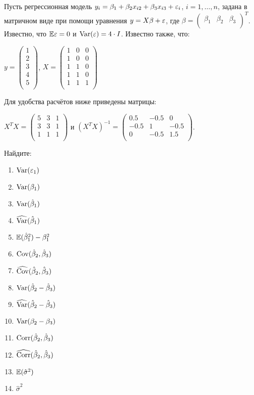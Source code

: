 \documentclass[pdftex,11pt,openany]{book}\usepackage[]{graphicx}\usepackage[]{color}
\begin{document}
\begin{problem}
Пусть регрессионная модель $y_i = \beta_1 + \beta_2 x_{i2} + \beta_3 x_{i3} + \varepsilon_i$, $i = 1, \ldots, n$, задана в матричном виде при помощи уравнения $y = X \beta + \varepsilon$, где $\beta =  \begin{pmatrix}
\beta_1 & \beta_2 & \beta_3\\
\end{pmatrix} ^T$. Известно, что $\mathbb{E} \varepsilon = 0$ и $\operatorname{Var} (\varepsilon) = 4 \cdot I$. Известно также, что:

$y =  \begin{pmatrix}
1 \\
2 \\
3 \\
4 \\
5 \\
\end{pmatrix} $, $X =  \begin{pmatrix}
1 & 0 & 0 \\
1 & 0 & 0 \\
1 & 1 & 0 \\
1 & 1 & 0 \\
1 & 1 & 1 \\
\end{pmatrix} $

Для удобства расчётов ниже приведены матрицы:

$X^T X =  \begin{pmatrix}
5 & 3 & 1 \\
3 & 3 & 1 \\
1 & 1 & 1 \\
\end{pmatrix} $ и $(X^T X)^{-1} =  \begin{pmatrix}
0.5 & -0.5 & 0 \\
-0.5 & 1 & -0.5 \\
0 & -0.5 & 1.5 \\
\end{pmatrix} $.

Найдите:
\begin{enumerate}
\item $\operatorname{Var} (\varepsilon_1)$
\item $\operatorname{Var} (\beta_1)$
\item $\operatorname{Var} (\hat{\beta}_1)$
\item $\widehat{\operatorname{Var} }(\hat{\beta}_1)$
\item $\mathbb{E} (\hat{\beta}_1^2) - \beta_1^2$
\item $\operatorname{Cov} (\hat{\beta}_2, \hat{\beta}_3)$
\item $\widehat{\operatorname{Cov} }(\hat{\beta}_2, \hat{\beta}_3)$
\item $\operatorname{Var} (\hat{\beta}_2 - \hat{\beta}_3)$
\item $\widehat{\operatorname{Var} }(\hat{\beta}_2 - \hat{\beta}_3)$
\item $\operatorname{Var} (\beta_2 - \beta_3)$
\item $\operatorname{Corr} (\hat{\beta}_2, \hat{\beta}_3)$
\item $\widehat{\operatorname{Corr}}(\hat{\beta}_2, \hat{\beta}_3)$
\item $\mathbb{E} (\hat{\sigma}^2)$
\item $\hat{\sigma}^2$
\end{enumerate}
\end{problem}
\begin{solution}
\end{solution}
\end{document}
